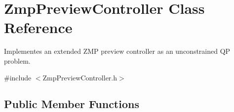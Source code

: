 \hypertarget{classZmpPreviewController}{\section{\-Zmp\-Preview\-Controller \-Class \-Reference}
\label{classZmpPreviewController}
}


\-Implementes an extended \-Z\-M\-P preview controller as an unconstrained \-Q\-P problem.  




{\ttfamily \#include $<$\-Zmp\-Preview\-Controller.\-h$>$}

\subsection*{\-Public \-Member \-Functions}
